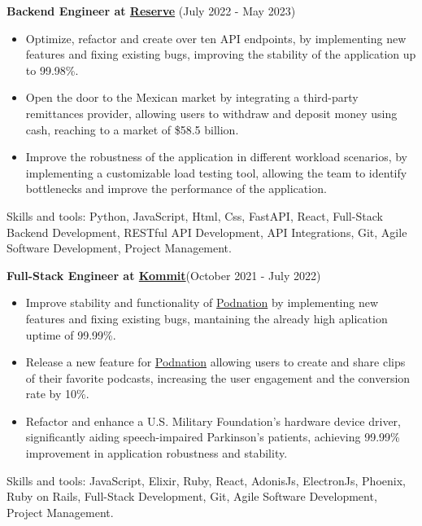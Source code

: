\documentclass[letterpaper,10pt]{article}
\begin{document}
  \vspace*{0.2cm}
  \textbf{Backend Engineer at  \href{https://reserve.org/}{Reserve}} (July 2022 - May 2023)
  \hfill
  \vspace*{0.2cm}
  \begin{minipage}{\linewidth}
    \begin{itemize}[noitemsep]
      \item Optimize, refactor and create over ten API endpoints, by implementing new features and fixing existing bugs, improving the stability of the application up to 99.98\%.
      \item Open the door to the Mexican market by integrating a third-party remittances provider, allowing users to withdraw and deposit money using cash, reaching to a market of \$58.5 billion.
      \item Improve the robustness of the application in different workload scenarios, by implementing a customizable load testing tool, allowing the team to identify bottlenecks and improve the performance of the application.
    \end{itemize}
    \hfill
  \end{minipage}
  Skills and tools: Python, JavaScript, Html, Css, FastAPI, React, Full-Stack Backend Development, RESTful API Development, API Integrations, Git, Agile Software Development, Project Management.
  
  \vspace*{0.2cm}
  \textbf{Full-Stack Engineer at \href{https://kommit.co/}{Kommit}}(October 2021 - July 2022)
  \hfill
  \vspace*{0.2cm}
  \begin{minipage}{\linewidth}
    \begin{itemize}[noitemsep]
      \item Improve stability and functionality of \href{https://www.podnation.co/}{Podnation} by implementing new features and fixing existing bugs, mantaining the already high aplication uptime of 99.99\%.
      \item Release a new feature for \href{https://www.podnation.co/}{Podnation} allowing users to create and share clips of their favorite podcasts, increasing the user engagement and the conversion rate by 10\%.
      \item Refactor and enhance a U.S. Military Foundation's hardware device driver, significantly aiding speech-impaired Parkinson's patients, achieving 99.99\% improvement in application robustness and stability.
    \end{itemize}
    \hfill
  \end{minipage}
  Skills and tools: JavaScript, Elixir, Ruby, React, AdonisJs, ElectronJs, Phoenix, Ruby on Rails, Full-Stack Development, Git, Agile Software Development, Project Management.
\end{document}
